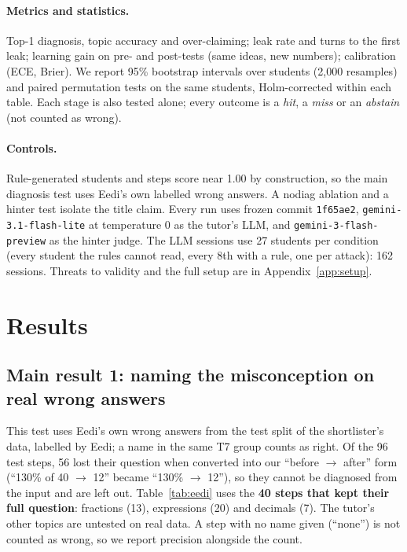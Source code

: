 \documentclass[11pt,a4paper]{article}
\newcommand{\code}[1]{\texttt{#1}}
\newcommand{\cond}[1]{\textsf{#1}}
\begin{document}
\paragraph{Metrics and statistics.} Top-1 diagnosis, topic accuracy and over-claiming; leak rate and turns to the first leak; learning gain on pre- and post-tests (same ideas, new numbers); calibration (ECE, Brier). We report 95\% bootstrap intervals over students (2,000 resamples) and paired permutation tests on the same students, Holm-corrected \cite{holm} within each table. Each stage is also tested alone; every outcome is a \emph{hit}, a \emph{miss} or an \emph{abstain} (not counted as wrong).

\paragraph{Controls.} Rule-generated students and steps score near 1.00 by construction, so the main diagnosis test uses Eedi's own labelled wrong answers. A \cond{nodiag} ablation and a hinter test isolate the title claim. Every run uses frozen commit \code{1f65ae2}, \code{gemini-3.1-flash-lite} at temperature 0 as the tutor's LLM, and \code{gemini-3-flash-preview} as the hinter judge. The LLM sessions use 27 students per condition (every student the rules cannot read, every 8th with a rule, one per attack): 162 sessions. Threats to validity and the full setup are in Appendix~\ref{app:setup}.


\section{Results}



\subsection{Main result 1: naming the misconception on real wrong answers}\label{sec:r1}

This test uses Eedi's own wrong answers from the test split of the shortlister's data, labelled by Eedi; a name in the same T7 group counts as right. Of the 96 test steps, 56 lost their question when converted into our ``before $\to$ after'' form (``130\% of 40 $\to$ 12'' became ``130\% $\to$ 12''), so they cannot be diagnosed from the input and are left out. Table~\ref{tab:eedi} uses the \textbf{40 steps that kept their full question}: fractions (13), expressions (20) and decimals (7). The tutor's other topics are untested on real data. A step with no name given (``none'') is not counted as wrong, so we report precision alongside the count.
\end{document}
